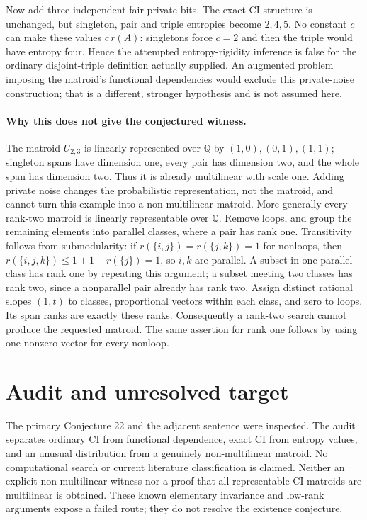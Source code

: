 \documentclass[11pt]{article}
\begin{document}
Now add three independent fair private bits. The exact CI structure
is unchanged, but singleton, pair and triple entropies become
$2,4,5$. No constant $c$ can make these values $c\,r(A)$:
singletons force $c=2$ and then the triple would have entropy four.
Hence the attempted entropy-rigidity inference is false for the
ordinary disjoint-triple definition actually supplied. An augmented
problem imposing the matroid's functional dependencies would exclude
this private-noise construction; that is a different, stronger
hypothesis and is not assumed here.

\paragraph{Why this does not give the conjectured witness.}
The matroid $U_{2,3}$ is linearly represented over $\mathbb Q$ by
$(1,0),(0,1),(1,1)$; singleton spans have dimension one, every pair
has dimension two, and the whole span has dimension two. Thus it is
already multilinear with scale one. Adding private noise changes the
probabilistic representation, not the matroid, and cannot turn this
example into a non-multilinear matroid.
More generally every rank-two matroid is linearly representable over
$\mathbb Q$. Remove loops, and group the remaining elements into
parallel classes, where a pair has rank one. Transitivity follows from
submodularity: if $r(\{i,j\})=r(\{j,k\})=1$ for nonloops, then
$r(\{i,j,k\})\le1+1-r(\{j\})=1$, so $i,k$ are parallel.
A subset in one parallel class has rank one by repeating this argument;
a subset meeting two classes has rank two, since a nonparallel pair
already has rank two. Assign distinct rational slopes $(1,t)$ to
classes, proportional vectors within each class, and zero to loops.
Its span ranks are exactly these ranks. Consequently a rank-two search
cannot produce the requested matroid. The same assertion for rank one
follows by using one nonzero vector for every nonloop.

\section{Audit and unresolved target}
The primary Conjecture 22 and the adjacent sentence were inspected.
The audit separates ordinary CI from functional dependence, exact CI
from entropy values, and an unusual distribution from a genuinely
non-multilinear matroid. No computational search or current literature
classification is claimed. Neither an explicit non-multilinear witness
nor a proof that all representable CI matroids are multilinear is
obtained. These known elementary invariance and low-rank arguments
expose a failed route; they do not resolve the existence conjecture.
\end{document}
